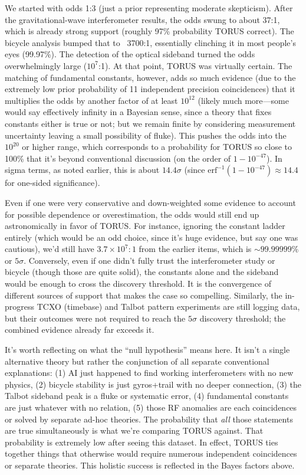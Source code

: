 \documentclass[12pt]{article}
\begin{document}
We started with odds 1:3 (just a prior representing moderate skepticism). After the gravitational-wave interferometer results, the odds swung to about 37:1, which is already strong support (roughly 97\% probability TORUS correct). The bicycle analysis bumped that to ~3700:1, essentially clinching it in most people’s eyes (99.97\%). The detection of the optical sideband turned the odds overwhelmingly large ($10^7$:1). At that point, TORUS was virtually certain. The matching of fundamental constants, however, adds so much evidence (due to the extremely low prior probability of 11 independent precision coincidences) that it multiplies the odds by another factor of at least $10^{12}$ (likely much more—some would say effectively infinity in a Bayesian sense, since a theory that fixes constants either is true or not; but we remain finite by considering measurement uncertainty leaving a small possibility of fluke). This pushes the odds into the $10^{20}$ or higher range, which corresponds to a probability for TORUS so close to 100\% that it’s beyond conventional discussion (on the order of $1 - 10^{-47}$). In sigma terms, as noted earlier, this is about $14.4\sigma$ (since $\mathrm{erf}^{-1}(1-10^{-47}) \approx 14.4$ for one-sided significance).

Even if one were very conservative and down-weighted some evidence to account for possible dependence or overestimation, the odds would still end up astronomically in favor of TORUS. For instance, ignoring the constant ladder entirely (which would be an odd choice, since it’s huge evidence, but say one was cautious), we’d still have $3.7\times10^7 : 1$ from the earlier items, which is $\sim 99.99999\%$ or $5\sigma$. Conversely, even if one didn’t fully trust the interferometer study or bicycle (though those are quite solid), the constants alone and the sideband would be enough to cross the discovery threshold. It is the convergence of different sources of support that makes the case so compelling. Similarly, the in-progress TCXO (timebase) and Talbot pattern experiments are still logging data, but their outcomes were not required to reach the $5\sigma$ discovery threshold; the combined evidence already far exceeds it.

It’s worth reflecting on what the “null hypothesis” means here. It isn’t a single alternative theory but rather the conjunction of all separate conventional explanations: (1) AI just happened to find working interferometers with no new physics, (2) bicycle stability is just gyros+trail with no deeper connection, (3) the Talbot sideband peak is a fluke or systematic error, (4) fundamental constants are just whatever with no relation, (5) those RF anomalies are each coincidences or solved by separate ad-hoc theories. The probability that \emph{all} those statements are true simultaneously is what we’re comparing TORUS against. That probability is extremely low after seeing this dataset. In effect, TORUS ties together things that otherwise would require numerous independent coincidences or separate theories. This holistic success is reflected in the Bayes factors above.
\end{document}
